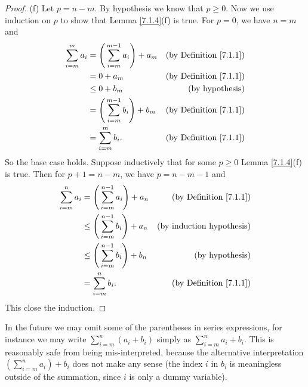 \begin{proof}{(f)}
    Let \(p = n - m\).
    By hypothesis we know that \(p \geq 0\).
    Now we use induction on \(p\) to show that Lemma \ref{7.1.4}(f) is true.
    For \(p = 0\), we have \(n = m\) and
    \begin{align*}
        \sum_{i = m}^m a_i & = \Bigg(\sum_{i = m}^{m - 1} a_i\Bigg) + a_m & \text{(by Definition \ref{7.1.1})} \\
                           & = 0 + a_m                                    & \text{(by Definition \ref{7.1.1})} \\
                           & \leq 0 + b_m                                 & \text{(by hypothesis)}             \\
                           & = \Bigg(\sum_{i = m}^{m - 1} b_i\Bigg) + b_m & \text{(by Definition \ref{7.1.1})} \\
                           & = \sum_{i = m}^m b_i.                        & \text{(by Definition \ref{7.1.1})} \\
    \end{align*}
    So the base case holds.
    Suppose inductively that for some \(p \geq 0\) Lemma \ref{7.1.4}(f) is true.
    Then for \(p + 1 = n - m\), we have \(p = n - m - 1\) and
    \begin{align*}
        \sum_{i = m}^n a_i & = \Bigg(\sum_{i = m}^{n - 1} a_i\Bigg) + a_n    & \text{(by Definition \ref{7.1.1})} \\
                           & \leq \Bigg(\sum_{i = m}^{n - 1} b_i\Bigg) + a_n & \text{(by induction hypothesis)}   \\
                           & \leq \Bigg(\sum_{i = m}^{n - 1} b_i\Bigg) + b_n & \text{(by hypothesis)}             \\
                           & = \sum_{i = m}^n b_i.                           & \text{(by Definition \ref{7.1.1})} \\
    \end{align*}
    This close the induction.
\end{proof}

\begin{remark}\label{7.1.5}
    In the future we may omit some of the parentheses in series expressions, for instance we may write \(\sum_{i = m}^n (a_i + b_i)\) simply as \(\sum_{i = m}^n a_i + b_i\).
    This is reasonably safe from being mis-interpreted, because the alternative interpretation \((\sum_{i = m}^n a_i) + b_i\) does not make any sense
    (the index \(i\) in \(b_i\) is meaningless outside of the summation, since \(i\) is only a dummy variable).
\end{remark}

